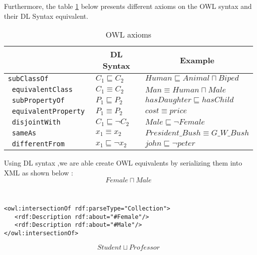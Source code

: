 Furthermore, the table \ref{tab:owlAxioms} \cite{HLP08} below presents different axioms on the OWL syntax and their DL Syntax equivalent. 

\begin{table}[H]
\centering
\begin{tabular}{ |>{\tt}l|l|l| }
    \hline
    \multicolumn{1}{|c|}{\textbf{Axiom}}    & \multicolumn{1}{c|}{\textbf{DL Syntax}}   & \multicolumn{1}{c|}{\textbf{Example}} \\ \hline
    subClassOf                              & $C_{1} \sqsubseteq C_{2}$                 & $\mathit{Human} \sqsubseteq \mathit{Animal} \sqcap \mathit{Biped}$ \\ \hline
    equivalentClass                         & $C_{1} \equiv C_{2}$                      & $\mathit{Man} \equiv \mathit{Human} \sqcap \mathit{Male}$ \\ \hline
    subPropertyOf                           & $P_{1} \sqsubseteq P_{2}$                 & $\mathit{hasDaughter} \sqsubseteq \mathit{hasChild}$ \\ \hline
    equivalentProperty                      & $P_{1} \equiv P_{2}$                      & $\mathit{cost} \equiv \mathit{price}$ \\ \hline
    disjointWith                            & $C_{1} \sqsubseteq \lnot C_{2}$           & $\mathit{Male} \sqsubseteq \lnot \mathit{Female}$ \\ \hline
    sameAs                                  & ${x_{1}} \equiv {x_{2}}$                  & $\mathit{President\_Bush} \equiv \mathit{G\_W\_Bush}$ \\ \hline
    differentFrom                           & ${x_{1}} \sqsubseteq \lnot {x_{2}}$       & $\mathit{john} \sqsubseteq \lnot \mathit{peter}$ \\ \hline
\end{tabular}

\caption{OWL axioms}
\label{tab:owlAxioms}
\end{table}


Using DL syntax ,we are able create OWL equivalents by serializing them into XML as shown below :
\[
\mathit{Female} \sqcap \mathit{Male}
\]

{\tt \small
\begin{verbatim}
<owl:intersectionOf rdf:parseType="Collection">
   <rdf:Description rdf:about="#Female"/>
   <rdf:Description rdf:about="#Male"/>
</owl:intersectionOf>
\end{verbatim}
}

\[
\mathit{Student} \sqcup \mathit{Professor}
\]

